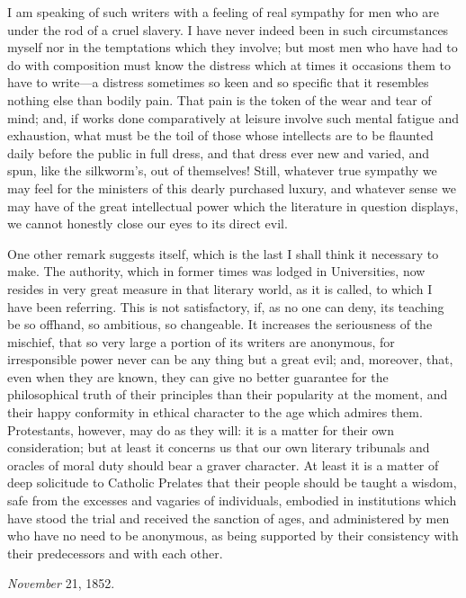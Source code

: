 I am speaking of such writers with a feeling of real sympathy for men
who are under the rod of a cruel slavery. I have never indeed been in
such circumstances myself nor in the temptations which they involve; but
most men who have had to do with composition must know the distress
which at times it occasions them to have to write—a distress sometimes
so keen and so specific that it resembles nothing else than bodily pain.
That pain is the token of the wear and tear of mind; and, if works done
comparatively at leisure involve such mental fatigue and exhaustion,
what must be the toil of those whose intellects are to be flaunted daily
before the public in full dress, and that dress ever new and varied, and
spun, like the silkworm's, out of themselves! Still, whatever true
sympathy we may feel for the ministers of this dearly purchased luxury,
and whatever sense we may have of the great intellectual power
which the literature in question displays, we cannot honestly close our
eyes to its direct evil.

One other remark suggests itself, which is the last I shall think it
necessary to make. The authority, which in former times was lodged in
Universities, now resides in very great measure in that literary world,
as it is called, to which I have been referring. This is not
satisfactory, if, as no one can deny, its teaching be so offhand, so
ambitious, so changeable. It increases the seriousness of the mischief,
that so very large a portion of its writers are anonymous, for
irresponsible power never can be any thing but a great evil; and,
moreover, that, even when they are known, they can give no better
guarantee for the philosophical truth of their principles than their
popularity at the moment, and their happy conformity in ethical
character to the age which admires them. Protestants, however, may do as
they will: it is a matter for their own consideration; but at least it
concerns us that our own literary tribunals and oracles of moral duty
should bear a graver character. At least it is a matter of deep
solicitude to Catholic Prelates that their people should be taught a
wisdom, safe from the excesses and vagaries of individuals, embodied in
institutions which have stood the trial and received the sanction of
ages, and administered by men who have no need to be anonymous, as being
supported by their consistency with their predecessors and with each
other.

\emph{November} 21, 1852.


